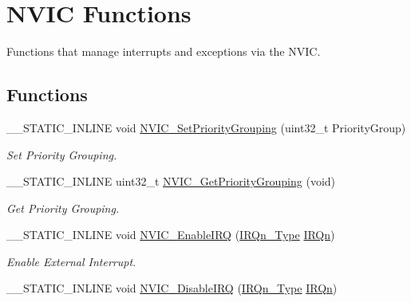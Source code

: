 \hypertarget{group__CMSIS__Core__NVICFunctions}{}\section{N\+V\+IC Functions}
\label{group__CMSIS__Core__NVICFunctions}


Functions that manage interrupts and exceptions via the N\+V\+IC.  


\subsection*{Functions}
\begin{DoxyCompactItemize}
\item 
\+\_\+\+\_\+\+S\+T\+A\+T\+I\+C\+\_\+\+I\+N\+L\+I\+NE void \mbox{\hyperlink{group__CMSIS__Core__NVICFunctions_ga77cfbb35a9d8027e392034321bed6904}{N\+V\+I\+C\+\_\+\+Set\+Priority\+Grouping}} (uint32\+\_\+t Priority\+Group)
\begin{DoxyCompactList}\small\item\em Set Priority Grouping. \end{DoxyCompactList}\item 
\+\_\+\+\_\+\+S\+T\+A\+T\+I\+C\+\_\+\+I\+N\+L\+I\+NE uint32\+\_\+t \mbox{\hyperlink{group__CMSIS__Core__NVICFunctions_ga394f7ce2ca826c0da26284d17ac6524d}{N\+V\+I\+C\+\_\+\+Get\+Priority\+Grouping}} (void)
\begin{DoxyCompactList}\small\item\em Get Priority Grouping. \end{DoxyCompactList}\item 
\+\_\+\+\_\+\+S\+T\+A\+T\+I\+C\+\_\+\+I\+N\+L\+I\+NE void \mbox{\hyperlink{group__CMSIS__Core__NVICFunctions_ga3349f2e3580d7ce22d6530b7294e5921}{N\+V\+I\+C\+\_\+\+Enable\+I\+RQ}} (\mbox{\hyperlink{group__SAME70J19__cmsis_gac3af4a32370fb28c4ade8bf2add80251}{I\+R\+Qn\+\_\+\+Type}} \mbox{\hyperlink{group__SAME70J19__cmsis_ga666eb0caeb12ec0e281415592ae89083}{I\+R\+Qn}})
\begin{DoxyCompactList}\small\item\em Enable External Interrupt. \end{DoxyCompactList}\item 
\+\_\+\+\_\+\+S\+T\+A\+T\+I\+C\+\_\+\+I\+N\+L\+I\+NE void \mbox{\hyperlink{group__CMSIS__Core__NVICFunctions_ga260fba04ac8346855c57f091d4ee1e71}{N\+V\+I\+C\+\_\+\+Disable\+I\+RQ}} (\mbox{\hyperlink{group__SAME70J19__cmsis_gac3af4a32370fb28c4ade8bf2add80251}{I\+R\+Qn\+\_\+\+Type}} \mbox{\hyperlink{group__SAME70J19__cmsis_ga666eb0caeb12ec0e281415592ae89083}{I\+R\+Qn}})

\end{DoxyCompactItemize}
